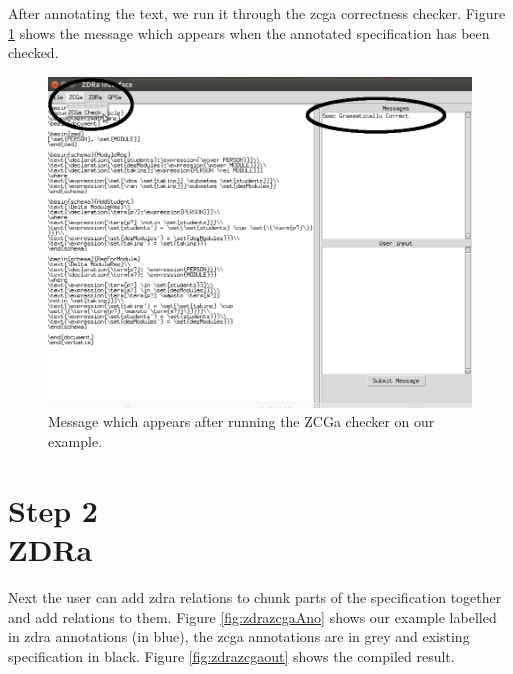 After annotating the text, we run it through the \gls{zcga} correctness checker. Figure
\ref{fig:zcgacorrect} shows the message which appears when the annotated
specification has been checked. 

\begin{figure}[H]
\centering
\includegraphics[scale=0.4]{Figures/fullexample/zcgacorrect.png}
\caption{Message which appears after running the ZCGa checker on our example. \label{fig:zcgacorrect}}
\end{figure}

\section{Step 2\\ZDRa}

Next the user can add \gls{zdra} relations to chunk parts of the specification
together and add relations to them. Figure \ref{fig:zdrazcgaAno} shows our
example labelled in \gls{zdra} annotations (in blue), the \gls{zcga} annotations
are in grey and existing specification in black. Figure \ref{fig:zdrazcgaout}
shows the compiled result.


